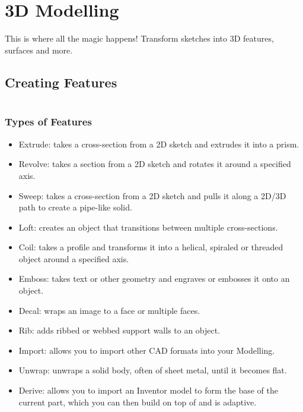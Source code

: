 \section{3D Modelling}

This is where all the magic happens! Transform sketches into 3D features, surfaces and more.

\subsection{Creating Features}

$ $

\subsubsection{Types of Features}
\begin{itemize}
\item Extrude: takes a cross-section from a 2D sketch and extrudes it into a prism.
\item Revolve: takes a section from a 2D sketch and rotates it around a specified axis.
\item Sweep: takes a cross-section from a 2D sketch and pulls it along a 2D/3D path to create a pipe-like solid.
\item Loft: creates an object that transitions between multiple cross-sections.
\item Coil: takes a profile and transforms it into a helical, spiraled or threaded object around a specified axis.
\item Emboss: takes text or other geometry and engraves or embosses it onto an object.
\item Decal: wraps an image to a face or multiple faces.
\item Rib: adds ribbed or webbed support walls to an object.
\item Import: allows you to import other CAD formats into your Modelling.
\item Unwrap: unwraps a solid body, often of sheet metal, until it becomes flat.
\item Derive: allows you to import an Inventor model to form the base of the current part, which you can then build on top of and is adaptive.
\end{itemize}

